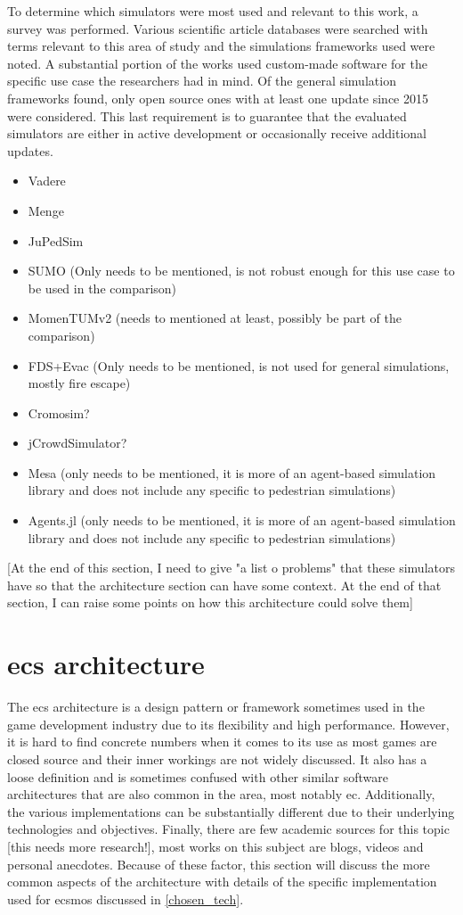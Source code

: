 \documentclass[twoside, 11pt]{article}
\begin{document}
To determine which simulators were most used and relevant to this work, a survey was performed. Various scientific article databases were searched with terms relevant to this area of study and the simulations frameworks used were noted. A substantial portion of the works used custom-made software for the specific use case the researchers had in mind. Of the general simulation frameworks found, only open source ones with at least one update since 2015 were considered. This last requirement is to guarantee that the evaluated simulators are either in active development or occasionally receive additional updates.

\begin{itemize}
  \item Vadere
  \item Menge
  \item JuPedSim
  \item SUMO (Only needs to be mentioned, is not robust enough for this use case to be used in the comparison)
  \item MomenTUMv2 (needs to mentioned at least, possibly be part of the comparison)
  \item FDS+Evac (Only needs to be mentioned, is not used for general simulations, mostly fire escape)
  \item Cromosim?
  \item jCrowdSimulator?
  \item Mesa (only needs to be mentioned, it is more of an agent-based simulation library and does not include any specific to pedestrian simulations)
  \item Agents.jl (only needs to be mentioned, it is more of an agent-based simulation library and does not include any specific to pedestrian simulations)
\end{itemize}

[At the end of this section, I need to give "a list o problems" that these simulators have so that the architecture section can have some context. At the end of that section, I can raise some points on how this architecture could solve them]

\section{\gls{ecs} architecture}

The \gls{ecs} architecture is a design pattern or framework sometimes used in the game development industry due to its flexibility and high performance. However, it is hard to find concrete numbers when it comes to its use as most games are closed source and their inner workings are not widely discussed. It also has a loose definition and is sometimes confused with other similar software architectures that are also common in the area, most notably \gls{ec}. Additionally, the various implementations can be substantially different due to their underlying technologies and objectives. Finally, there are few academic sources for this topic [this needs more research!], most works on this subject are blogs, videos and personal anecdotes. Because of these factor, this section will discuss the more common aspects of the architecture with details of the specific implementation used for \gls{ecsmos} discussed in \ref{chosen_tech}.
\end{document}
